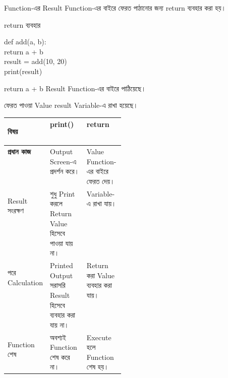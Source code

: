 

Function-এর Result Function-এর বাইরে ফেরত পাঠানোর জন্য
\textenglish{\ttfamily return}
ব্যবহার করা হয়।

\begin{codeoutputbox}{\textenglish{\ttfamily return} ব্যবহার}

\noindent
\begin{minipage}[t]{0.54\linewidth}
\codeheading

\begin{english}
\ttfamily
def add(a, b):\\
\hspace*{4mm}return a + b\\[0.5mm]
result = add(10, 20)\\
print(result)
\end{english}

\end{minipage}
\hfill
\begin{minipage}[t]{0.42\linewidth}
\outputheading

\begin{center}
\textenglish{}
\end{center}

\textenglish{\ttfamily return a + b}
Result Function-এর বাইরে পাঠিয়েছে।

ফেরত পাওয়া Value
\textenglish{\ttfamily result}
Variable-এ রাখা হয়েছে।

\end{minipage}

\end{codeoutputbox}



\begin{tabularx}
{\linewidth}
{
|>{\bfseries\RaggedRight\arraybackslash}p{0.27\linewidth}
|Y
|Y|
}

\hline
{}

\textbf{বিষয়}
&
\textenglish{\ttfamily print()}
&
\textenglish{\ttfamily return}
\\
\hline

প্রধান কাজ
&
Output Screen-এ প্রদর্শন করে।
&
Value Function-এর বাইরে ফেরত দেয়।
\\
\hline

Result সংরক্ষণ
&
শুধু Print করলে Return Value হিসেবে পাওয়া যায় না।
&
Variable-এ রাখা যায়।
\\
\hline

পরে Calculation
&
Printed Output সরাসরি Result হিসেবে ব্যবহার করা যায় না।
&
Return করা Value ব্যবহার করা যায়।
\\
\hline

Function শেষ
&
অবশ্যই Function শেষ করে না।
&
Execute হলে Function শেষ হয়।
\\
\hline

\end{tabularx}

